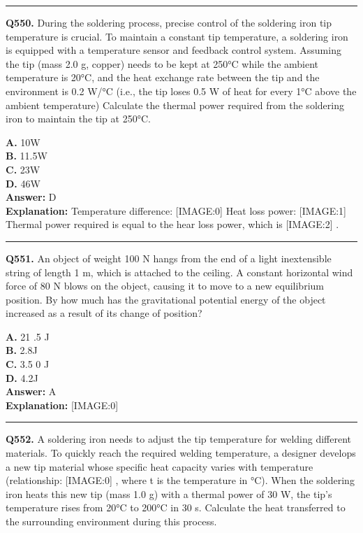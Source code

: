 \documentclass[12pt]{article}
\begin{document}
\hrule
\vspace{1em}


\noindent
\textbf{Q550.} During the soldering process, precise control of the soldering iron tip temperature is crucial. To maintain a constant tip temperature, a soldering iron is equipped with a temperature sensor and feedback control system. Assuming the tip (mass 2.0 g, copper) needs to be kept at 250°C while the ambient temperature is 20°C, and the heat exchange rate between the tip and the environment is 0.2 W/°C (i.e., the tip loses 0.5 W of heat for every 1°C above the ambient temperature)
Calculate the thermal power required from the soldering iron to maintain the tip at 250°C.



\textbf{A.} 10W \\
\textbf{B.} 11.5W \\
\textbf{C.} 23W \\
\textbf{D.} 46W \\

\textbf{Answer:} D \\
\textbf{Explanation:} Temperature difference:
[IMAGE:0]
Heat loss power:
[IMAGE:1]
Thermal power required is equal to the hear loss power, which is
[IMAGE:2]
.

\hrule
\vspace{1em}


\noindent
\textbf{Q551.} An object of weight
100
N hangs from the end of a light inextensible string of length
1
m, which is attached to the ceiling. A constant horizontal wind force of
80
N blows on the object, causing it to move to a new equilibrium position. By how much has the gravitational potential energy of the object increased as a result of its change of position?



\textbf{A.} 21
.5
J \\
\textbf{B.} 2.8J \\
\textbf{C.} 3.5
0
J \\
\textbf{D.} 4.2J \\

\textbf{Answer:} A \\
\textbf{Explanation:} [IMAGE:0]

\hrule
\vspace{1em}


\noindent
\textbf{Q552.} A soldering iron needs to adjust the tip temperature for welding different materials. To quickly reach the required welding temperature, a designer develops a new tip material whose specific heat capacity varies with temperature (relationship:
[IMAGE:0]
, where t is the temperature in °C). When the soldering iron heats this new tip (mass 1.0 g) with a thermal power of 30 W, the tip's temperature rises from 20°C to 200°C in 30 s.
Calculate the heat transferred to the surrounding environment during this process.
\end{document}
